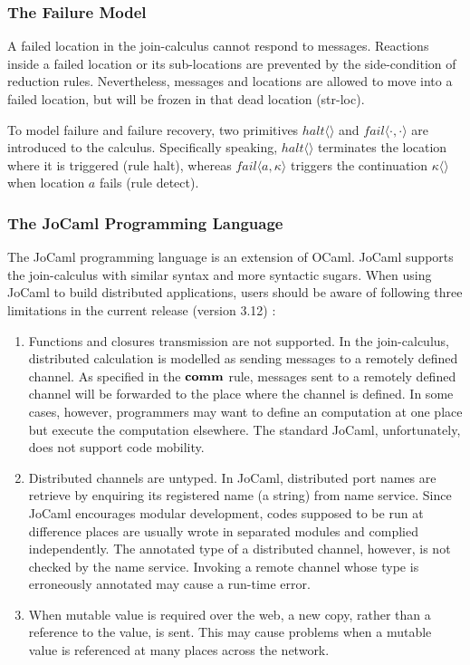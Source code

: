 \subsubsection{The Failure Model}
A failed location in the join-calculus cannot respond to messages.  Reactions inside a failed location or its sub-locations are prevented by the side-condition of reduction rules.  Nevertheless, messages and locations are allowed to move into a failed location, but will be frozen in that dead location (str-loc).

To model failure and failure recovery, two primitives $halt\langle\rangle$ and $fail\langle \cdot, \cdot \rangle$ are introduced to the calculus.  Specifically speaking, $halt\langle\rangle$ terminates the location where it is triggered (rule halt), whereas $fail\langle a,\kappa \rangle$ triggers the continuation $\kappa\langle\rangle$ when location $a$ fails (rule detect).  

\subsubsection{The JoCaml Programming Language}

The JoCaml programming language is an extension of OCaml.  JoCaml supports the join-calculus with similar syntax and more syntactic sugars.  When using JoCaml to build distributed applications, users should be aware of following three limitations in the current release (version 3.12) \cite{jocaml_lan}:
\begin{enumerate} [1.]
  \item Functions and closures transmission are not supported.  In the join-calculus, distributed calculation is modelled as sending messages to a remotely defined channel.  As specified in the $\bf{comm}$ rule, messages sent to a remotely defined channel will be forwarded to the place where the channel is defined.  In some cases, however, programmers may want to define an computation at one place but execute the computation elsewhere.  The standard JoCaml, unfortunately, does not support code mobility.
  \item Distributed channels are untyped.  In JoCaml, distributed port names are retrieve by enquiring its registered name (a string) from name service.  Since JoCaml encourages modular development, codes supposed to be run at difference places are usually wrote in separated modules and complied independently.  The annotated type of a distributed channel, however, is not checked by the name service.  Invoking a remote channel whose type is erroneously annotated may cause a run-time error.
  \item  When mutable value is required over the web, a new copy, rather than a reference to the value, is sent.  This may cause problems when a mutable value is referenced at many places across the network.
\end{enumerate}